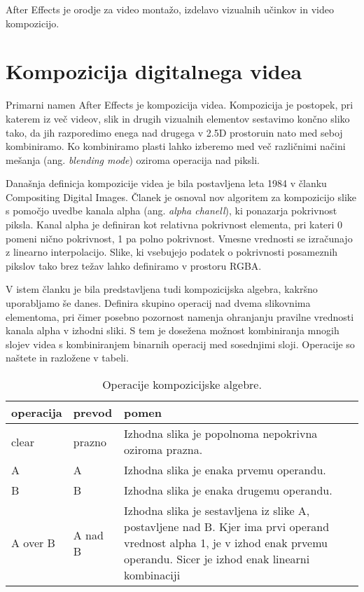 \documentclass[a4paper, 12pt]{book}
\begin{document}
After Effects je orodje za video montažo, izdelavo vizualnih učinkov in video kompozicijo.

\section{Kompozicija digitalnega videa}

Primarni namen After Effects je kompozicija videa.
Kompozicija je postopek, pri katerem iz več videov, slik in drugih vizualnih elementov sestavimo končno sliko tako,
da jih razporedimo enega nad drugega v 2.5D prostoru\footnotemark in nato med seboj kombiniramo\cite{siggraphcomposition}.
Ko kombiniramo plasti lahko izberemo med več različnimi načini mešanja (ang. {\it blending mode}) oziroma operacija nad piksli.

Današnja definicja kompozicije videa je bila postavljena leta 1984 v članku Compositing Digital Images\cite{siggraphcompostition}.
Članek je osnoval nov algoritem za kompozicijo slike s pomočjo uvedbe kanala alpha (ang. {\it alpha chanell}), ki ponazarja pokrivnost piksla.
Kanal alpha je definiran kot relativna pokrivnost elementa, pri kateri 0 pomeni nično pokrivnost, 1 pa polno pokrivnost.
Vmesne vrednosti se izračunajo z linearno interpolacijo.
Slike, ki vsebujejo podatek o pokrivnosti posameznih pikslov tako brez težav lahko definiramo v prostoru RGBA.

V istem članku je bila predstavljena tudi kompozicijska algebra, kakršno uporabljamo še danes.
Definira skupino operacij nad dvema slikovnima elementoma, pri čimer posebno pozornost namenja ohranjanju pravilne vrednosti kanala alpha v izhodni sliki.
S tem je dosežena možnost kombiniranja mnogih slojev videa s kombiniranjem binarnih operacij med sosednjimi sloji.
Operacije so naštete in razložene v tabeli. %

\begin{table}
\begin{center}
\begin{tabular}{p{} | p{} | p{} }
\hline
{\bf operacija} & {\bf prevod } & {\bf pomen} \\ \hline
clear & prazno & Izhodna slika je popolnoma nepokrivna oziroma prazna. \\ \hline
A & A & Izhodna slika je enaka prvemu operandu. \\
B & B & Izhodna slika je enaka drugemu operandu. \\ \hline
A over B & A nad B & Izhodna slika je sestavljena iz slike A, postavljene nad B. Kjer ima prvi operand vrednost alpha 1, je v izhod enak prvemu operandu. Sicer je izhod enak linearni kombinaciji \\
\end{tabular}
\end{center}
\caption{Operacije kompozicijske algebre.}
\label{tbl:kompOperacije}
\end{table}
\end{document}
